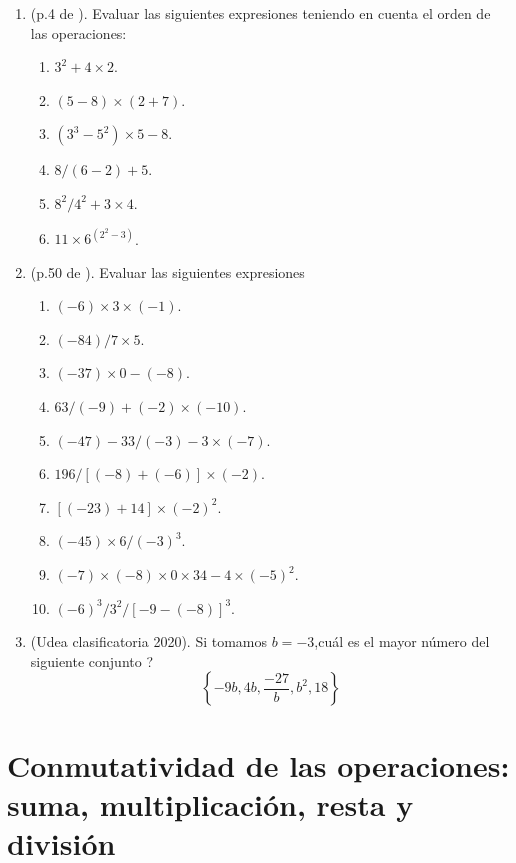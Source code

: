 \begin{enumerate}
\item (p.4 de \cite{Aops_algebra}). Evaluar las siguientes expresiones teniendo en cuenta el orden de las operaciones:
		\begin{multicols}{3}
		\begin{enumerate}[label=\Alph*)]
				\item $3^2 +4\times 2$.
				\item $(5-8)\times (2+7)$.
				\item $(3^3-5^2)\times 5 - 8$.	
				\item $8/(6-2)+5$.
				\item $8^2/4^2+3\times 4$.
				\item $11\times 6^{(2^2-3)}$.					
		\end{enumerate}	
		\end{multicols}
\item (p.50 de \cite{Dimensions_Math_7A}). Evaluar las siguientes expresiones
		\begin{multicols}{2}
		\begin{enumerate}[label=\Alph*)]
				\item $(-6)\times 3\times (-1)$.
				\item $(-84)/7\times 5$.
				\item $(-37)\times 0 - (-8)$.	
				\item $63/(-9)+(-2)\times (-10)$.
				\item $(-47)-33/(-3)-3\times(-7)$.
				\item $196/\left[ (-8) + (-6) \right]\times (-2)$.	
				\item $\left[(-23)+14\right]\times {(-2)}^2$.	
				\item $(-45)\times 6/{(-3)}^3$.
				\item $(-7)\times(-8)\times 0\times 34 - 4 \times {(-5)}^2$.
				\item ${(-6)}^3/3^2/{\left[-9-(-8)\right]}^3$.			
		\end{enumerate}	
		\end{multicols}
\item (Udea clasificatoria 2020). Si tomamos $b=-3$,cuál es el mayor número del siguiente conjunto ?
\[
\left\{	-9b, 4b, \frac{-27}{b}, b^2, 18	\right\}
\]
\end{enumerate}
\newpage

\section{Conmutatividad de las operaciones: suma, multiplicación, resta y división }\label{subsubsection_conmutatividad_de_operaciones}

